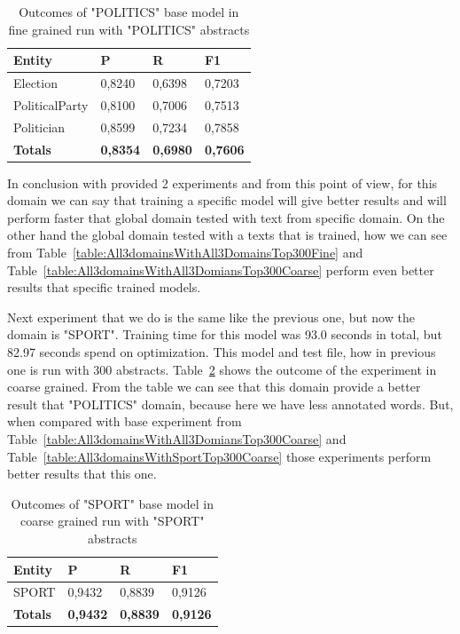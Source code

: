 \documentclass[thesis=M,english]{FITthesis}[2018/05/30]
\begin{document}
	\begin{table}[H]\centering
		\begin{tabular}{|l|l|l|l|}
			\hline {\textbf{Entity}} & {\textbf{P}} & {\textbf{R}} & {\textbf{F1}}\\\hline
				Election & 0,8240 & 0,6398 & 0,7203\\
				PoliticalParty & 0,8100 & 0,7006 & 0,7513\\
				Politician & 0,8599 & 0,7234 & 0,7858\\\hline
				\textbf{Totals} & \textbf{0,8354} & \textbf{0,6980} & \textbf{0,7606}\\\hline
		\end{tabular}
		\caption{Outcomes of "POLITICS" base model in fine grained run with "POLITICS" abstracts \label{table:PoliticsdomainsWithPoliticsTop300Fine}}
	\end{table}	
	
	In conclusion with provided 2 experiments and from this point of view, for this domain we can say that training a specific model will give better results and will perform faster that global domain tested with text from specific domain. On the other hand the global domain tested with a texts that is trained, how we can see from Table~\ref{table:All3domainsWithAll3DomainsTop300Fine} and Table~\ref{table:All3domainsWithAll3DomiansTop300Coarse} perform even better results that specific trained models.  


Next experiment that we do is the same like the previous one, but now the domain is "SPORT". Training time for this model was 93.0 seconds in total, but 82.97 seconds spend on optimization. This model and test file, how in previous one is run with 300 abstracts. Table~\ref{table:SportdomainsWithSportTop300Coarse} shows the outcome of the experiment in coarse grained. From the table we can see that this domain provide a better result that "POLITICS" domain, because here we have less annotated words. But, when compared with base experiment from Table~\ref{table:All3domainsWithAll3DomiansTop300Coarse} and Table~\ref{table:All3domainsWithSportTop300Coarse} those experiments perform better results that this one. 
	\begin{table}[H]\centering
		\begin{tabular}{|l|l|l|l|}
			\hline {\textbf{Entity}} & {\textbf{P}} & {\textbf{R}} & {\textbf{F1}}\\\hline
				SPORT & 0,9432 & 0,8839 & 0,9126\\\hline
				\textbf{Totals} & \textbf{0,9432} & \textbf{0,8839} & \textbf{0,9126}\\\hline
		\end{tabular}
		\caption{Outcomes of "SPORT" base model in coarse grained run with "SPORT" abstracts \label{table:SportdomainsWithSportTop300Coarse}}
	\end{table}
\end{document}
